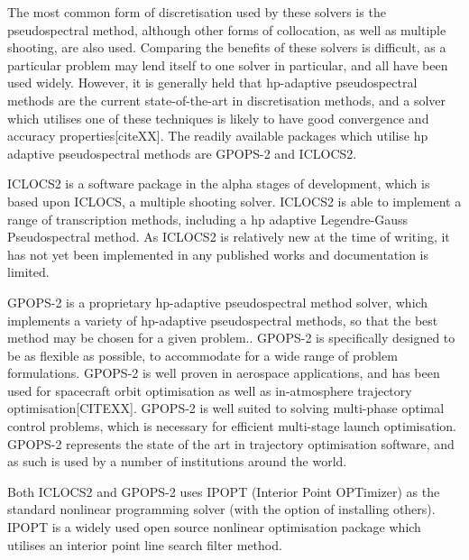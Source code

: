  The most common form of discretisation used by these solvers is the pseudospectral method, although other forms of collocation, as well as multiple shooting, are also used. Comparing the benefits of these solvers is difficult, as a particular problem may lend itself to one solver in particular, and all have been used widely. However, it is generally held that hp-adaptive pseudospectral methods are the current state-of-the-art in discretisation methods, and a solver which utilises one of these techniques is likely to have good convergence and accuracy properties[citeXX]. The readily available packages which utilise hp adaptive pseudospectral methods are GPOPS-2 and ICLOCS2.
 
 ICLOCS2 is a software package in the alpha stages of development, which is based upon ICLOCS, a multiple shooting solver. ICLOCS2 is able to implement a range of transcription methods, including a hp adaptive Legendre-Gauss Pseudospectral method. As ICLOCS2 is relatively new at the time of writing, it has not yet been implemented in any published works and documentation is limited. 
 
GPOPS-2 is a proprietary hp-adaptive pseudospectral method solver, which implements a variety of hp-adaptive pseudospectral methods, so that the best method may be chosen for a given problem.. GPOPS-2 is specifically designed to be as flexible as possible, to accommodate for a wide range of problem formulations. GPOPS-2 is well proven in aerospace applications, and has been used for spacecraft orbit optimisation as well as in-atmosphere trajectory optimisation[CITEXX]. GPOPS-2 is well suited to solving multi-phase optimal control problems, which is necessary for efficient multi-stage launch optimisation. GPOPS-2 represents the state of the art in trajectory optimisation software, and as such is used by a number of institutions around the world. 

 Both ICLOCS2 and GPOPS-2 uses IPOPT (Interior Point OPTimizer) as the standard nonlinear programming solver (with the option of installing others). IPOPT is a widely used open source nonlinear optimisation package which utilises an interior point line search filter method. 

